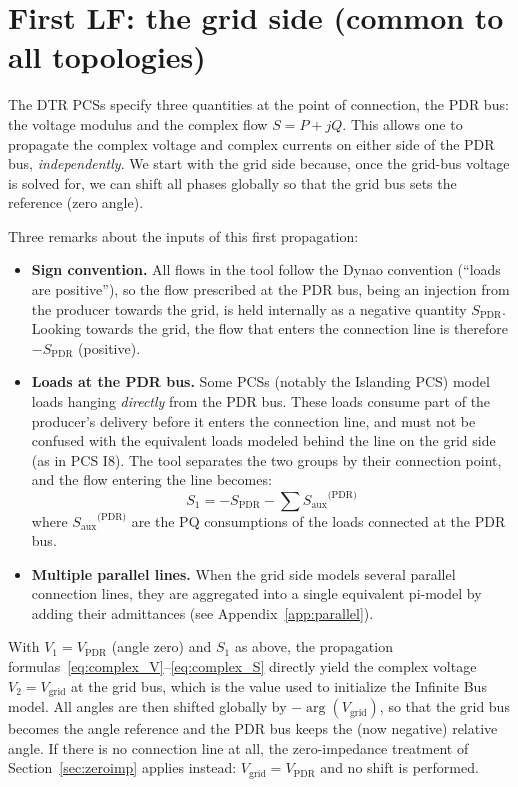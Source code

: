 \documentclass[a4paper,11pt]{article}
\newcommand{\Dynawo}{Dyna\textomega o} %
\newcommand{\Vpdr}{\ensuremath{V_{\textrm{PDR}}}}
\newcommand{\Spdr}{\ensuremath{S_{\textrm{PDR}}}}
\newcommand{\Saux}{\ensuremath{S_{\textrm{aux}}}}
\begin{document}
\section{First LF: the grid side (common to all topologies)}
\label{sec:gridside}

The DTR PCSs specify three quantities at the point of connection, the PDR bus: the
voltage modulus and the complex flow $S=P+jQ$. This allows one to propagate the complex
voltage and complex currents on either side of the PDR bus, \emph{independently}. We
start with the grid side because, once the grid-bus voltage is solved for, we can shift
all phases globally so that the grid bus sets the reference (zero angle).

Three remarks about the inputs of this first propagation:
\begin{itemize}
\item \textbf{Sign convention.} All flows in the tool follow the \Dynawo{} convention
  (``loads are positive''), so the flow prescribed at the PDR bus, being an injection
  from the producer towards the grid, is held internally as a negative quantity
  $\Spdr$. Looking towards the grid, the flow that enters the connection line is
  therefore $-\Spdr$ (positive).
\item \textbf{Loads at the PDR bus.} Some PCSs (notably the Islanding PCS) model loads
  hanging \emph{directly} from the PDR bus. These loads consume part of the producer's
  delivery before it enters the connection line, and must not be confused with the
  equivalent loads modeled behind the line on the grid side (as in PCS I8). The tool
  separates the two groups by their connection point, and the flow entering the line
  becomes:
  \begin{equation}
    S_1 = -\Spdr - \sum \Saux^{\textrm{(PDR)}}
    \label{eq:pdrloads}
  \end{equation}
  where $\Saux^{\textrm{(PDR)}}$ are the PQ consumptions of the loads connected at the
  PDR bus.
\item \textbf{Multiple parallel lines.} When the grid side models several parallel
  connection lines, they are aggregated into a single equivalent pi-model by adding
  their admittances (see Appendix~\ref{app:parallel}).
\end{itemize}

With $V_1 = \Vpdr$ (angle zero) and $S_1$ as above, the propagation
formulas~\eqref{eq:complex_V}--\eqref{eq:complex_S} directly yield the complex voltage
$V_2 = V_{\textrm{grid}}$ at the grid bus, which is the value used to initialize the
Infinite Bus model. All angles are then shifted globally by $-\arg(V_{\textrm{grid}})$,
so that the grid bus becomes the angle reference and the PDR bus keeps the (now
negative) relative angle. If there is no connection line at all, the zero-impedance
treatment of Section~\ref{sec:zeroimp} applies instead: $V_{\textrm{grid}} = \Vpdr$ and
no shift is performed.
\end{document}
